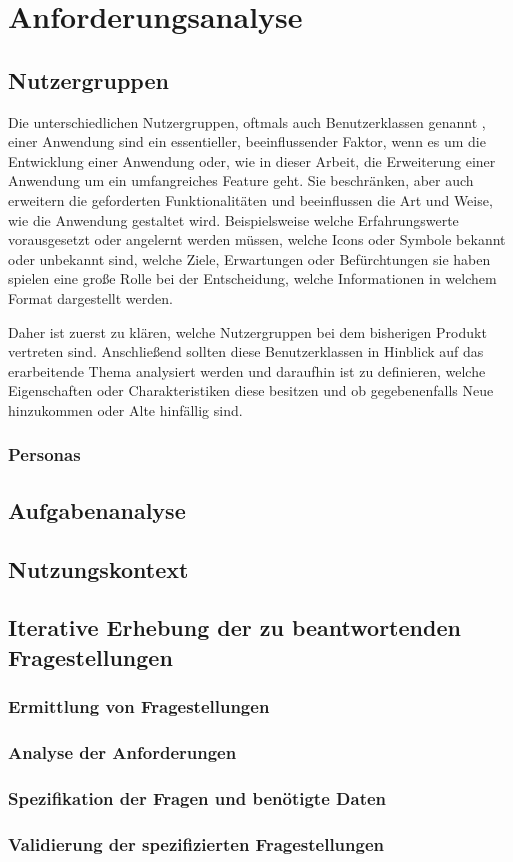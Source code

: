\chapter{Anforderungsanalyse}
\label{anforderungsanalyse}
\minitoc\pagebreak
\section{Nutzergruppen}
Die unterschiedlichen Nutzergruppen, oftmals auch Benutzerklassen genannt \cite{Herczeg.2018}, einer Anwendung sind ein essentieller, beeinflussender Faktor, wenn es um die Entwicklung einer Anwendung oder, wie in dieser Arbeit, die Erweiterung einer Anwendung um ein umfangreiches Feature geht. Sie beschränken, aber auch erweitern die geforderten Funktionalitäten und beeinflussen die Art und Weise, wie die Anwendung gestaltet wird. Beispielsweise welche Erfahrungswerte vorausgesetzt oder angelernt werden müssen, welche Icons oder Symbole bekannt oder unbekannt sind, welche Ziele, Erwartungen oder Befürchtungen sie haben spielen eine große Rolle bei der Entscheidung, welche Informationen in welchem Format dargestellt werden.

Daher ist zuerst zu klären, welche Nutzergruppen bei dem bisherigen Produkt vertreten sind. Anschließend sollten diese Benutzerklassen in Hinblick auf das erarbeitende Thema analysiert werden und daraufhin ist zu definieren, welche Eigenschaften oder Charakteristiken diese besitzen und ob gegebenenfalls Neue hinzukommen oder Alte hinfällig sind. 
\subsection{Personas}
\section{Aufgabenanalyse}

\section{Nutzungskontext}

\section{Iterative Erhebung der zu beantwortenden Fragestellungen}
\subsection{Ermittlung von Fragestellungen}
\subsection{Analyse der Anforderungen}
\subsection{Spezifikation der Fragen und benötigte Daten}
\subsection{Validierung der spezifizierten Fragestellungen}